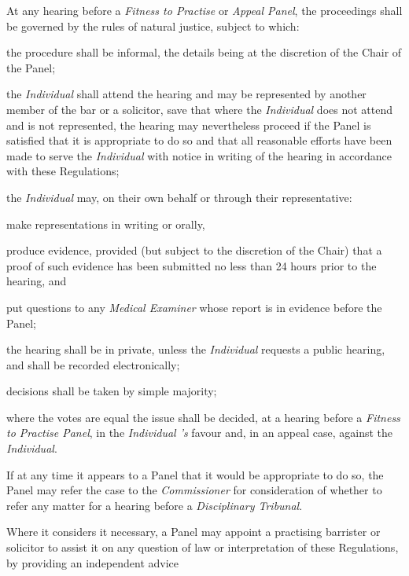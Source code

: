 At any hearing before a \emph{Fitness to
Practise} or \emph{Appeal Panel}, the proceedings shall be governed by
the rules of natural justice, subject to which:\\\nl \item the procedure shall be informal, the details being at the discretion
of the Chair of the Panel;\item the \emph{Individual} shall attend the hearing and may be represented
by another member of the bar or a solicitor, save that where
the \emph{Individual} does not attend and is not represented, the
hearing may nevertheless proceed if the Panel is satisfied that it is
appropriate to do so and that all reasonable efforts have been made to
serve the \emph{Individual} with notice in writing of the hearing in
accordance with these Regulations;\item the \emph{Individual }may, on their own behalf or through their
representative:\al
\item  make representations in writing or orally,\\
\item  produce evidence, provided (but subject to the discretion of the
Chair) that a proof of such evidence has been submitted no less than 24
hours prior to the hearing, and\\
\item put questions to any \emph{Medical Examiner} whose report is in
evidence before the Panel;\la
\item the hearing shall be in private, unless
the \emph{Individual }requests a public hearing, and shall be recorded
electronically;\item decisions shall be taken by simple majority;\item where the votes are equal the issue shall be decided, at a hearing
before a \emph{Fitness to Practise Panel}, in
the \emph{Individual 's} favour and, in an appeal case, against
the \emph{Individual}.\ln
{}\par
If at any time it appears to a Panel that it would be appropriate to do
so, the Panel may refer the case to the \emph{Commissioner} for
consideration of whether to refer any matter for a hearing before
a \emph{Disciplinary Tribunal}. 
\par
Where it considers it necessary, a Panel may appoint a practising
barrister or solicitor to assist it on any question of law or
interpretation of these Regulations, by providing an independent advice
